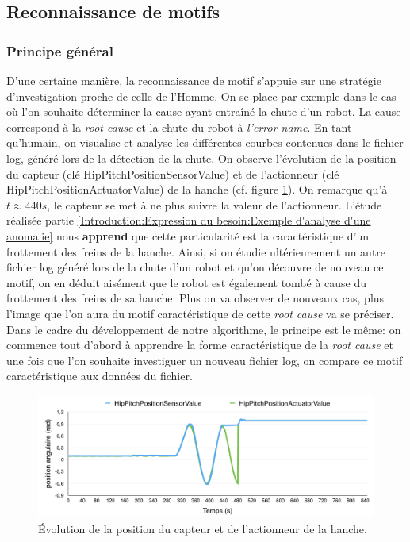 \subsection{Reconnaissance de motifs}
\label{Automatisation du processus d'investigation: Reconnaissance de motifs}

\subsubsection{Principe général}
\label{Automatisation du processus d'investigation: Reconnaissance de motifs: Principes généraux}
D'une certaine manière, la reconnaissance de motif s'appuie sur une stratégie d'investigation proche de celle de l'Homme. On se place par exemple dans le cas où l'on souhaite déterminer la cause ayant entraîné la chute d'un robot. La cause correspond à la \emph{root cause} et la chute du robot à \emph{l'error name}. En tant qu'humain, on visualise et analyse les différentes courbes contenues dans le fichier log, généré lors de la détection de la chute. On observe l'évolution de la position du capteur (clé HipPitchPositionSensorValue) et de l'actionneur (clé HipPitchPositionActuatorValue) de la hanche (cf. figure \ref{fig:Évolution de la position du capteur et de l'actionneur de la hanche}). On remarque qu'à $t \approx 440 s$, le capteur se met à ne plus suivre la valeur de l'actionneur. L'étude réalisée partie \ref{Introduction:Expression du besoin:Exemple d'analyse d'une anomalie} nous \textbf{apprend} que cette particularité est la caractéristique d'un frottement des freins de la hanche. Ainsi, si on étudie ultérieurement un autre fichier log généré lors de la chute d'un robot et qu'on découvre de nouveau ce motif, on en déduit aisément que le robot est également tombé à cause du frottement des freins de sa hanche. Plus on va observer de nouveaux cas, plus l'image que l'on aura du motif caractéristique de cette \emph{root cause} va se préciser.\\
Dans le cadre du développement de notre algorithme, le principe est le même: on commence tout d'abord à apprendre la forme caractéristique de la\emph{ root cause} et une fois que l'on souhaite investiguer un nouveau fichier log, on compare ce motif caractéristique aux données du fichier. 

\begin{figure}[h]
	\centering\includegraphics[width=15cm]{images/hipPitch.png}
	\caption[Évolution de la position du capteur et de l'actionneur de la hanche]{Évolution de la position du capteur et de l'actionneur de la hanche.}
	\label{fig:Évolution de la position du capteur et de l'actionneur de la hanche}
\end{figure}

